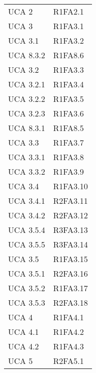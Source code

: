 {\begin{longtable}{ C{4cm} C{4cm}}
UCA 2 & R1FA2.1\\

UCA 3 & R1FA3.1\\

UCA 3.1 & R1FA3.2\\

UCA 8.3.2 & R1FA8.6\\

UCA 3.2 & R1FA3.3\\

UCA 3.2.1 & R1FA3.4\\


UCA 3.2.2 & R1FA3.5\\

UCA 3.2.3 & R1FA3.6\\

UCA 8.3.1 & R1FA8.5\\

UCA 3.3 & R1FA3.7\\

UCA 3.3.1 & R1FA3.8\\

UCA 3.3.2 & R1FA3.9\\

UCA 3.4 & R1FA3.10\\

UCA 3.4.1 & R2FA3.11\\

UCA 3.4.2 & R2FA3.12\\

UCA 3.5.4 & R3FA3.13\\


UCA 3.5.5 & R3FA3.14\\

UCA 3.5 & R1FA3.15\\

UCA 3.5.1 & R2FA3.16\\

UCA 3.5.2 & R1FA3.17\\

UCA 3.5.3 & R2FA3.18\\

UCA 4 & R1FA4.1\\

UCA 4.1 & R1FA4.2\\

UCA 4.2 & R1FA4.3\\

UCA 5 & R2FA5.1\\


\end{longtable}}
